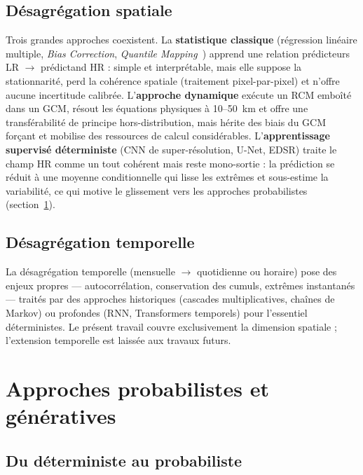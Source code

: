\documentclass[14pt,a4paper,openany]{extreport}
\begin{document}
\subsection{Désagrégation spatiale}
\label{ssec:disagg-spatiale}

Trois grandes approches coexistent. La \textbf{statistique classique} (régression linéaire multiple, \emph{Bias Correction}, \emph{Quantile Mapping}~\cite{maraun_widmann_2018}) apprend une relation prédicteurs LR $\to$ prédictand HR : simple et interprétable, mais elle suppose la stationnarité, perd la cohérence spatiale (traitement pixel-par-pixel) et n'offre aucune incertitude calibrée. L'\textbf{approche dynamique} exécute un RCM emboîté dans un GCM, résout les équations physiques à 10--50~km et offre une transférabilité de principe hors-distribution, mais hérite des biais du GCM forçant et mobilise des ressources de calcul considérables. L'\textbf{apprentissage supervisé déterministe} (CNN de super-résolution, U-Net, EDSR) traite le champ HR comme un tout cohérent mais reste mono-sortie : la prédiction se réduit à une moyenne conditionnelle qui lisse les extrêmes et sous-estime la variabilité, ce qui motive le glissement vers les approches probabilistes (section~\ref{sec:generatifs}).

\subsection{Désagrégation temporelle}
\label{ssec:disagg-temporelle}

La désagrégation temporelle (mensuelle $\to$ quotidienne ou horaire) pose des enjeux propres --- autocorrélation, conservation des cumuls, extrêmes instantanés --- traités par des approches historiques (cascades multiplicatives, chaînes de Markov) ou profondes (RNN, Transformers temporels) pour l'essentiel déterministes. Le présent travail couvre exclusivement la dimension spatiale ; l'extension temporelle est laissée aux travaux futurs.

\section{Approches probabilistes et génératives}
\label{sec:generatifs}

\subsection{Du déterministe au probabiliste}
\label{ssec:det-vs-proba}
\end{document}
